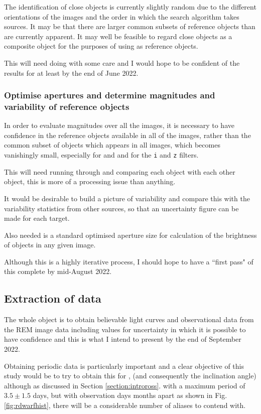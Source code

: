 The identification of close objects is currently slightly random due to the
different orientations of the images and the order in which the search
algorithm takes sources. It may be that there are larger common subsets of
reference objects than are currently apparent. It may well be feasible to
regard close objects as a composite object for the purposes of using as
reference objects.

This will need doing with some care and I would hope to be confident of the
results for at least {\prox} by the end of June 2022.

\subsubsection{Optimise apertures and determine magnitudes and variability of
reference objects} \protect\label{section:fwoptap}

In order to evaluate magnitudes over all the images, it is necessary to have
confidence in the reference objects available in all of the images, rather than
the common subset of objects which appears in all images, which becomes
vanishingly small, especially for {\ross} and {\bstar} and for the \texttt{i}
and \texttt{z} filters.

This will need running through and comparing each object with each other object,
this is more of a processing issue than anything.

It would be desirable to build a picture of variability and compare this with the
variability statistics from other sources, so that an uncertainty figure can
be made for each target.

Also needed is a standard optimised aperture size for calculation of the
brightness of objects in any given image.

Although this is a highly iterative process, I should hope to have a ``first
pass" of this complete by mid-August 2022.

\subsection{Extraction of data}
\protect\label{section:fwextract}

The whole object is to obtain believable light curves and observational data
from the REM image data including values for uncertainty in which it is possible
to have confidence and this is what I intend to present by the end of September
2022.

Obtaining periodic data is particularly important and a clear objective of this
study would be to try to obtain this for \ross, (and consequently the
inclination angle) although as discussed in Section \ref{section:introross}. with a maximum
period of $3.5 \pm 1.5$ days, but with observation days months apart as shown in Fig. \ref{fig:rdwarfhist}, there will
be a considerable number of aliases to contend with.

